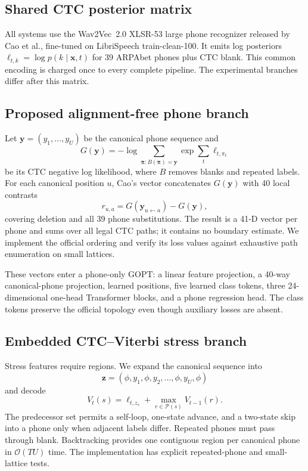 \documentclass[10pt,conference]{IEEEtran}
\begin{document}
\subsection{Shared CTC posterior matrix}

All systems use the Wav2Vec~2.0 XLSR-53 large phone recognizer released by Cao
et al., fine-tuned on LibriSpeech train-clean-100. It emits log posteriors
$\ell_{t,k}=\log p(k\mid\mathbf{x},t)$ for 39 ARPAbet phones plus CTC blank.
This common encoding is charged once to every complete pipeline. The
experimental branches differ after this matrix.

\subsection{Proposed alignment-free phone branch}

Let $\mathbf{y}=(y_1,\ldots,y_U)$ be the canonical phone sequence and
\begin{equation}
G(\mathbf{y})=-\log\sum_{\boldsymbol{\pi}:B(\boldsymbol{\pi})=\mathbf{y}}
\exp\sum_t \ell_{t,\pi_t}
\end{equation}
be its CTC negative log likelihood, where $B$ removes blanks and repeated
labels. For each canonical position $u$, Cao's vector concatenates
$G(\mathbf{y})$ with 40 local contrasts
\begin{equation}
r_{u,a}=G(\mathbf{y}_{u\leftarrow a})-G(\mathbf{y}),
\end{equation}
covering deletion and all 39 phone substitutions. The result is a 41-D vector
per phone and sums over all legal CTC paths; it contains no boundary estimate.
We implement the official ordering and verify its loss values against
exhaustive path enumeration on small lattices.

These vectors enter a phone-only GOPT: a linear feature projection, a 40-way
canonical-phone projection, learned positions, five learned class tokens,
three 24-dimensional one-head Transformer blocks, and a phone regression head.
The class tokens preserve the official topology even though auxiliary losses
are absent.

\subsection{Embedded CTC--Viterbi stress branch}

Stress features require regions. We expand the canonical sequence into
\begin{equation}
\mathbf{z}=(\phi,y_1,\phi,y_2,\ldots,\phi,y_U,\phi)
\end{equation}
and decode
\begin{equation}
V_t(s)=\ell_{t,z_s}+\max_{r\in\mathcal{P}(s)}V_{t-1}(r).
\end{equation}
The predecessor set permits a self-loop, one-state advance, and a two-state
skip into a phone only when adjacent labels differ. Repeated phones must pass
through blank. Backtracking provides one contiguous region per canonical phone
in $\mathcal{O}(TU)$ time. The implementation has explicit repeated-phone and
small-lattice tests.
\end{document}
